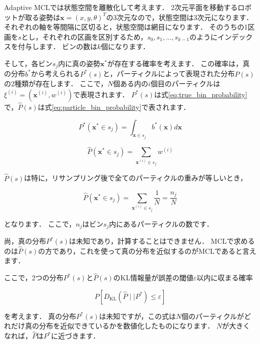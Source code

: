 \documentclass[{../../master}]{subfiles}
\begin{document}
Adaptive MCLでは状態空間を離散化して考えます．
2次元平面を移動するロボットが取る姿勢は$\bm{x} = (x, y, \theta)^T$の3次元なので，状態空間は3次元になります．
それぞれの軸を等間隔に区切ると，状態空間は網目になります．
そのうちの1区画を$s$とし，それぞれの区画を区別するため，$s_0, s_1, \ldots, s_{k-1}$のようにインデックスを付与します．
ビンの数は$k$個になります．

そして，各ビン$s_j$内に真の姿勢$\bm{x}^*$が存在する確率を考えます．
この確率は，真の分布$b^{*}$から考えられる$P^{*}(s)$と，パーティクルによって表現された分布$\hat{P}(s)$の2種類が存在します．
ここで，$N$個ある内の$i$個目のパーティクルは$\xi^{(i)} = (\bm{x}^{(i)}, w^{(i)})$で表現されます．
$P^{*}(s)$は式\ref{eq:true_bin_probability}で，$\hat{P}(s)$は式\ref{eq:particle_bin_probability}で表されます．

\begin{equation}
  P^{*}(\bm{x}^{*} \in s_{j}) = \int_{\bm{x} \in s_{j}} b^{*}(\bm{x})d\bm{x}
  \label{eq:true_bin_probability}
\end{equation}

\begin{equation}
  \hat{P}(\bm{x}^{*} \in s_{j}) = \sum_{\bm{x}^{(i)} \in s_{j}} w^{(i)}
  \label{eq:particle_bin_probability}
\end{equation}

$\hat{P}(s)$は特に，リサンプリング後で全てのパーティクルの重みが等しいとき，

\begin{equation}
  \hat{P}(\bm{x}^{*} \in s_{j}) = \sum_{\bm{x}^{(i)} \in s_{j}} \frac{1}{N} = \frac{n_j}{N}
  \label{eq:particles_with_equal_weights}
\end{equation}

\noindent
となります．
ここで，$n_j$はビン$s_j$内にあるパーティクルの数です．

尚，真の分布$P^{*}(s)$は未知であり，計算することはできません．
MCLで求めるのは$\hat{P}(s)$の方であり，これを使って真の分布を近似するのがMCLであると言えます．

ここで，2つの分布$P^{*}(s)$と$\hat{P}(s)$のKL情報量が誤差の閾値$\varepsilon$以内に収まる確率

\begin{equation}
  P[D_{\text{KL}}(\hat{P} \mid\mid P^{*}) \leq \varepsilon]
\end{equation}

\noindent
を考えます．
真の分布$P^{*}(s)$は未知ですが，この式は$N$個のパーティクルがどれだけ真の分布を近似できているかを数値化したものになります．
$N$が大きくなれば，$\hat{P}$は$P^{*}$に近づきます．
\end{document}
